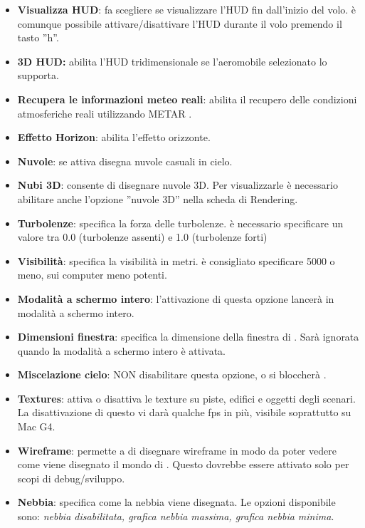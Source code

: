 {\begin{itemize}
\item \textbf{Visualizza HUD}: fa scegliere se visualizzare l'HUD fin dall'inizio del volo. \`{e} comunque possibile attivare/disattivare l'HUD durante il volo premendo il tasto ''h''.
\item \textbf{3D HUD:} abilita l'HUD tridimensionale se l'aeromobile selezionato lo supporta.
\item \textbf{Recupera le informazioni meteo reali}: abilita il recupero delle condizioni atmosferiche reali utilizzando METAR .
\item \textbf{Effetto Horizon}: abilita l'effetto orizzonte.
\item \textbf{Nuvole}: se attiva disegna nuvole casuali in cielo.
\item \textbf{Nubi 3D}: consente di disegnare nuvole 3D. Per visualizzarle \`{e} necessario abilitare anche l'opzione ''nuvole 3D'' nella scheda di Rendering.
\item \textbf{Turbolenze}: specifica la forza delle turbolenze. \`{e} necessario specificare un valore tra 0.0 (turbolenze assenti) e 1.0 (turbolenze forti)
\item \textbf{Visibilit\`{a}}: specifica la visibilit\`{a} in metri. \`{e} consigliato specificare 5000 o meno, sui computer meno potenti.
\item \textbf{Modalit\`{a} a schermo intero}: l'attivazione di questa opzione lancer\`{a} \FlightGear{} in modalit\`{a} a schermo intero.
\item \textbf{Dimensioni finestra}: specifica la dimensione della finestra di \FlightGear{}. Sar\`{a} ignorata quando la modalit\`{a} a schermo intero \`{e} attivata.
\item \textbf{Miscelazione cielo}: NON disabilitare questa opzione, o si bloccher\`{a} \FlightGear{}.
\item \textbf{Textures}: attiva o disattiva le texture su piste, edifici e oggetti degli scenari. La disattivazione di questo vi dar\`{a} qualche fps in pi\`{u}, visibile soprattutto su Mac G4.
\item \textbf{Wireframe}: permette a \FlightGear{} di disegnare wireframe in modo da poter vedere come viene disegnato il mondo di \FlightGear{}. Questo dovrebbe essere attivato solo per scopi di debug/sviluppo.
\item \textbf{Nebbia}: specifica come la nebbia viene disegnata. Le opzioni disponibile sono: \textit{nebbia disabilitata, grafica nebbia massima, grafica nebbia minima}.
\end{itemize}
}{}


